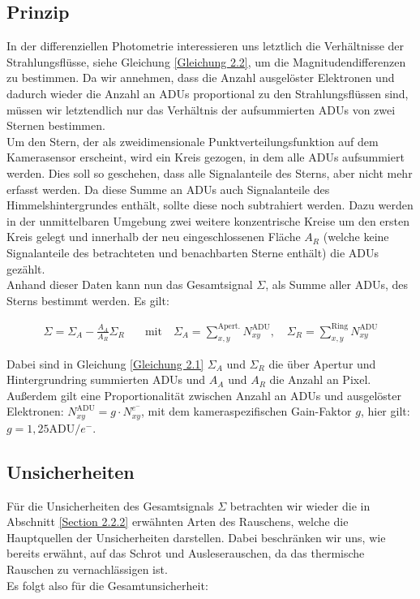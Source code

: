 \documentclass[ngerman,ruledheaders=section,class=report,thesis={type=Protokoll},accentcolor=1b,marginpar=false,parskip=half-,fontsize=11pt,]{tudapub}
\begin{document}
	\subsection{Prinzip}
	In der differenziellen Photometrie interessieren uns letztlich die Verhältnisse der Strahlungsflüsse, siehe Gleichung \ref{Gleichung 2.2}, um die Magnitudendifferenzen zu bestimmen. Da wir annehmen, dass die Anzahl ausgelöster Elektronen und dadurch wieder die Anzahl an ADUs proportional zu den Strahlungsflüssen sind, müssen wir letztendlich nur das Verhältnis der aufsummierten ADUs von zwei Sternen bestimmen. \\
	Um den Stern, der als zweidimensionale Punktverteilungsfunktion auf dem Kamerasensor erscheint, wird ein Kreis gezogen, in dem alle ADUs aufsummiert werden. Dies soll so geschehen, dass alle Signalanteile des Sterns, aber nicht mehr erfasst werden. Da diese Summe an ADUs auch Signalanteile des Himmelshintergrundes enthält, sollte diese noch subtrahiert werden. Dazu werden in der unmittelbaren Umgebung zwei weitere konzentrische Kreise um den ersten Kreis gelegt und innerhalb der neu eingeschlossenen Fläche $A_R$ (welche keine Signalanteile des betrachteten und benachbarten Sterne enthält) die ADUs gezählt. \\
	Anhand dieser Daten kann nun das Gesamtsignal $\Sigma$, als Summe aller ADUs, des Sterns bestimmt werden. Es gilt:
	
	\begin{equation}\label{Gleichung 2.4}
		\begin{aligned}
			\Sigma = \Sigma_A - \frac{A_A}{A_R}\Sigma_R  &
			\quad   \text{mit}
			\quad   \Sigma_A=\sum_{x,y}^{\text{Apert.}}N_{xy}^{\text{ADU}}, 
			\quad \Sigma_R = \sum_{x,y}^{\text{Ring}}N_{xy}^{\text{ADU}}
		\end{aligned}
	\end{equation}
	
	Dabei sind in Gleichung \ref{Gleichung 2.1} $\Sigma_A$ und $\Sigma_R$ die über Apertur und Hintergrundring summierten ADUs und $A_A$ und $A_R$ die Anzahl an Pixel. Außerdem gilt eine Proportionalität zwischen Anzahl an ADUs und ausgelöster Elektronen: $N_{xy}^{\text{ADU}} = g \cdot N_{xy}^{e^-}$, mit dem kameraspezifischen Gain-Faktor $g$, hier gilt: $g = 1,25 \text{ADU}/ e^-$. \\
	
	\subsection{Unsicherheiten}\label{Subsec 2.3.2}
	Für die Unsicherheiten des Gesamtsignals $\Sigma$ betrachten wir wieder die in Abschnitt \ref{Section 2.2.2} erwähnten Arten des Rauschens, welche die Hauptquellen der Unsicherheiten darstellen. Dabei beschränken wir uns, wie bereits erwähnt, auf das Schrot und Ausleserauschen, da das thermische Rauschen zu vernachlässigen ist. \\
	Es folgt also für die Gesamtunsicherheit:
	
\end{document}
